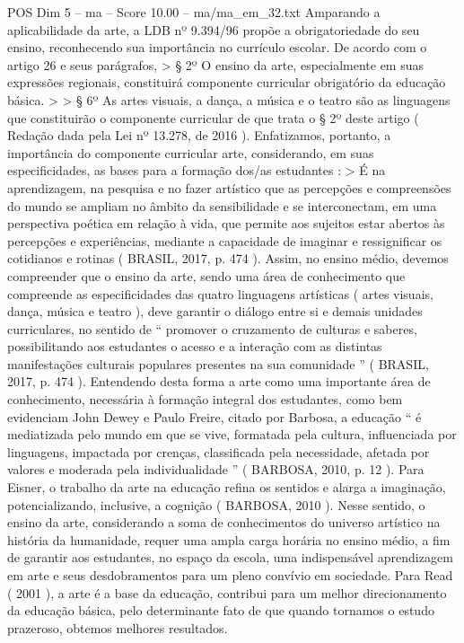 \begin{textsample}{POS Dim 5 – ma – Score 10.00 – ma/ma\_em\_32.txt}
Amparando a aplicabilidade da arte, a LDB nº 9.394/96 propõe a obrigatoriedade do seu ensino, reconhecendo sua importância no currículo escolar.
De acordo com o artigo 26 e seus parágrafos, > § 2º O ensino da arte, especialmente em suas expressões regionais, constituirá componente curricular obrigatório da educação básica. > > § 6º As artes visuais, a dança, a música e o teatro são as linguagens que constituirão o componente curricular de que trata o § 2º deste artigo ( Redação dada pela Lei nº 13.278, de 2016 ).
Enfatizamos, portanto, a importância do componente curricular arte, considerando, em suas especificidades, as bases para a formação dos/as estudantes : > É na aprendizagem, na pesquisa e no fazer artístico que as percepções e compreensões do mundo se ampliam no âmbito da sensibilidade e se interconectam, em uma perspectiva poética em relação à vida, que permite aos sujeitos estar abertos às percepções e experiências, mediante a capacidade de imaginar e ressignificar os cotidianos e rotinas ( BRASIL, 2017, p. 474 ).
Assim, no ensino médio, devemos compreender que o ensino da arte, sendo uma área de conhecimento que compreende as especificidades das quatro linguagens artísticas ( artes visuais, dança, música e teatro ), deve garantir o diálogo entre si e demais unidades curriculares, no sentido de “ promover o cruzamento de culturas e saberes, possibilitando aos estudantes o acesso e a interação com as distintas manifestações culturais populares presentes na sua comunidade ” ( BRASIL, 2017, p. 474 ).
Entendendo desta forma a arte como uma importante área de conhecimento, necessária à formação integral dos estudantes, como bem evidenciam John Dewey e Paulo Freire, citado por Barbosa, a educação “ é mediatizada pelo mundo em que se vive, formatada pela cultura, influenciada por linguagens, impactada por crenças, classificada pela necessidade, afetada por valores e moderada pela individualidade ” ( BARBOSA, 2010, p. 12 ).
Para Eisner, o trabalho da arte na educação refina os sentidos e alarga a imaginação, potencializando, inclusive, a cognição ( BARBOSA, 2010 ).
Nesse sentido, o ensino da arte, considerando a soma de conhecimentos do universo artístico na história da humanidade, requer uma ampla carga horária no ensino médio, a fim de garantir aos estudantes, no espaço da escola, uma indispensável aprendizagem em arte e seus desdobramentos para um pleno convívio em sociedade.
Para Read ( 2001 ), a arte é a base da educação, contribui para um melhor direcionamento da educação básica, pelo determinante fato de que quando tornamos o estudo prazeroso, obtemos melhores resultados.

\end{textsample}
